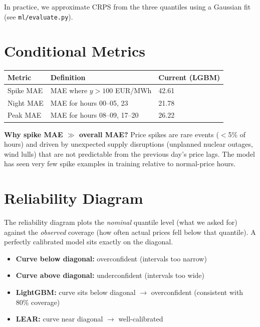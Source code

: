 \documentclass[12pt, a4paper, oneside]{memoir}
\newcommand{\EUR}{EUR/MWh}
\newcommand{\filepath}[1]{\textcolor{se3blue}{\texttt{\footnotesize #1}}}
\begin{document}
In practice, we approximate CRPS from the three quantiles using a Gaussian fit
(see \filepath{ml/evaluate.py}).

\section{Conditional Metrics}

\begin{center}
\begin{tabular}{lll}
\toprule
\textbf{Metric} & \textbf{Definition} & \textbf{Current (LGBM)} \\
\midrule
Spike MAE  & MAE where $y > 100$ \EUR{} & 42.61 \\
Night MAE  & MAE for hours 00--05, 23   & 21.78 \\
Peak MAE   & MAE for hours 08--09, 17--20 & 26.22 \\
\bottomrule
\end{tabular}
\end{center}

\begin{intuition}
\textbf{Why spike MAE $\gg$ overall MAE?} Price spikes are rare events ($<$5\% of
hours) and driven by unexpected supply disruptions (unplanned nuclear outages, wind
lulls) that are not predictable from the previous day's price lags. The model has seen
very few spike examples in training relative to normal-price hours.
\end{intuition}

\section{Reliability Diagram}

The reliability diagram plots the \emph{nominal} quantile level (what we asked for)
against the \emph{observed} coverage (how often actual prices fell below that quantile).
A perfectly calibrated model sits exactly on the diagonal.

\begin{itemize}
  \item \textbf{Curve below diagonal:} overconfident (intervals too narrow)
  \item \textbf{Curve above diagonal:} underconfident (intervals too wide)
  \item \textbf{LightGBM:} curve sits below diagonal $\rightarrow$ overconfident
    (consistent with 80\% coverage)
  \item \textbf{LEAR:} curve near diagonal $\rightarrow$ well-calibrated
\end{itemize}
\end{document}
